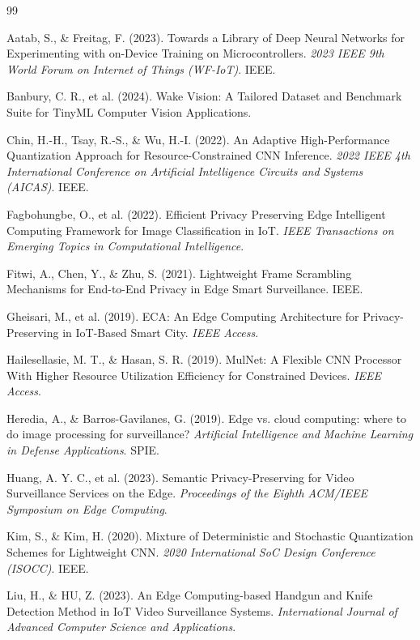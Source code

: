 \documentclass[12pt, a4paper]{article}
\begin{document}
\begin{thebibliography}{99}

 Aatab, S., \& Freitag, F. (2023). Towards a Library of Deep Neural Networks for Experimenting with on-Device Training on Microcontrollers. \textit{2023 IEEE 9th World Forum on Internet of Things (WF-IoT)}. IEEE. %

 Banbury, C. R., et al. (2024). Wake Vision: A Tailored Dataset and Benchmark Suite for TinyML Computer Vision Applications. %

 Chin, H.-H., Tsay, R.-S., \& Wu, H.-I. (2022). An Adaptive High-Performance Quantization Approach for Resource-Constrained CNN Inference. \textit{2022 IEEE 4th International Conference on Artificial Intelligence Circuits and Systems (AICAS)}. IEEE. %

 Fagbohungbe, O., et al. (2022). Efficient Privacy Preserving Edge Intelligent Computing Framework for Image Classification in IoT. \textit{IEEE Transactions on Emerging Topics in Computational Intelligence}. %

 Fitwi, A., Chen, Y., \& Zhu, S. (2021). Lightweight Frame Scrambling Mechanisms for End-to-End Privacy in Edge Smart Surveillance. IEEE. %

 Gheisari, M., et al. (2019). ECA: An Edge Computing Architecture for Privacy-Preserving in IoT-Based Smart City. \textit{IEEE Access}. %

 Hailesellasie, M. T., \& Hasan, S. R. (2019). MulNet: A Flexible CNN Processor With Higher Resource Utilization Efficiency for Constrained Devices. \textit{IEEE Access}. %

 Heredia, A., \& Barros-Gavilanes, G. (2019). Edge vs. cloud computing: where to do image processing for surveillance? \textit{Artificial Intelligence and Machine Learning in Defense Applications}. SPIE. %

 Huang, A. Y. C., et al. (2023). Semantic Privacy-Preserving for Video Surveillance Services on the Edge. \textit{Proceedings of the Eighth ACM/IEEE Symposium on Edge Computing}. %

 Kim, S., \& Kim, H. (2020). Mixture of Deterministic and Stochastic Quantization Schemes for Lightweight CNN. \textit{2020 International SoC Design Conference (ISOCC)}. IEEE. %

 Liu, H., \& HU, Z. (2023). An Edge Computing-based Handgun and Knife Detection Method in IoT Video Surveillance Systems. \textit{International Journal of Advanced Computer Science and Applications}. %


\end{thebibliography}
\end{document}
